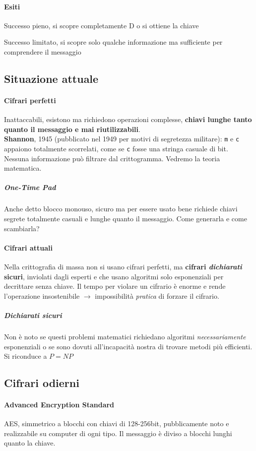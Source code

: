 \documentclass[10pt]{book}
\begin{document}
\paragraph{Esiti}
\begin{list}{}{}
	\item Successo pieno, si scopre completamente D o si ottiene la chiave
	\item Successo limitato, si scopre solo qualche informazione ma sufficiente per comprendere il messaggio
\end{list}
\subsection{Situazione attuale}
\paragraph{Cifrari perfetti} Inattaccabili, esistono ma richiedono operazioni complesse, \textbf{chiavi lunghe tanto quanto il messaggio e mai riutilizzabili}.\\
\textbf{Shannon}, 1945 (pubblicato nel 1949 per motivi di segretezza militare): \texttt{m} e \texttt{c} appaiono totalmente scorrelati, come se \texttt{c} fosse una stringa casuale di bit.\\Nessuna informazione può filtrare dal crittogramma. Vedremo la teoria matematica.
\subparagraph{One-Time Pad} Anche detto blocco monouso, sicuro ma per essere usato bene richiede chiavi segrete totalmente casuali e lunghe quanto il messaggio. Come generarla e come scambiarla?
\paragraph{Cifrari attuali} Nella crittografia di massa non si usano cifrari perfetti, ma \textbf{cifrari \textit{dichiarati} sicuri}, inviolati dagli esperti e che usano algoritmi solo esponenziali per decrittare senza chiave. Il tempo per violare un cifrario è enorme e rende l'operazione insostenibile $\rightarrow$ impossibilità \textit{pratica} di forzare il cifrario.
\subparagraph{Dichiarati sicuri} Non è noto se questi problemi matematici richiedano algoritmi \textit{necessariamente} esponenziali o se sono dovuti all'incapacità nostra di trovare metodi più efficienti. Si riconduce a $P = NP$
\subsection{Cifrari odierni}
\paragraph{Advanced Encryption Standard} AES, simmetrico a blocchi con chiavi di 128-256bit, pubblicamente noto e realizzabile su computer di ogni tipo. Il messaggio è diviso a blocchi lunghi quanto la chiave.
\end{document}
